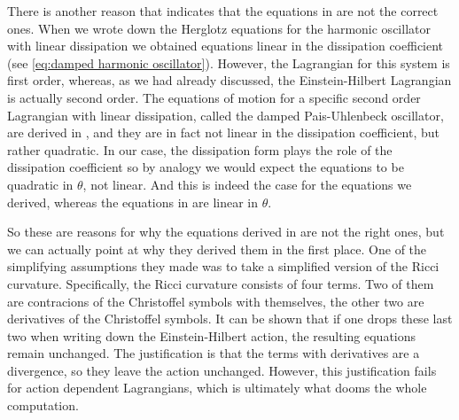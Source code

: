 \documentclass[../main.tex]{subfiles}
\begin{document}
There is another reason that indicates that the equations in \cite{Lazo2017} are not the
correct ones. When we wrote down the Herglotz equations for the harmonic oscillator with
linear dissipation we obtained equations linear in the dissipation coefficient (see
\cref{eq:damped harmonic oscillator}). However, the Lagrangian for this system is first
order, whereas, as we had already discussed, the Einstein-Hilbert Lagrangian is actually
second order. The equations of motion for a specific second order Lagrangian with linear
dissipation, called the damped Pais-Uhlenbeck oscillator, are derived in \cite{Leon2021a},
and they are in fact not linear in the dissipation coefficient, but rather quadratic. In
our case, the dissipation form plays the role of the dissipation coefficient so by analogy
we would expect the equations to be quadratic in \( \theta \), not linear. And this is
indeed the case for the equations we derived, whereas the equations in \cite{Lazo2017} are
linear in \( \theta \).

So these are reasons for why the equations derived in \cite{Lazo2017} are not the right
ones, but we can actually point at why they derived them in the first place. One of the
simplifying assumptions they made was to take a simplified version of the Ricci curvature.
Specifically, the Ricci curvature consists of four terms. Two of them are contracions of
the Christoffel symbols with themselves, the other two are derivatives of the Christoffel
symbols. It can be shown that if one drops these last two when writing down the
Einstein-Hilbert action, the resulting equations remain unchanged. The justification is
that the terms with derivatives are a divergence, so they leave the action unchanged.
However, this justification fails for action dependent Lagrangians, which is ultimately
what dooms the whole computation. 
\end{document}
